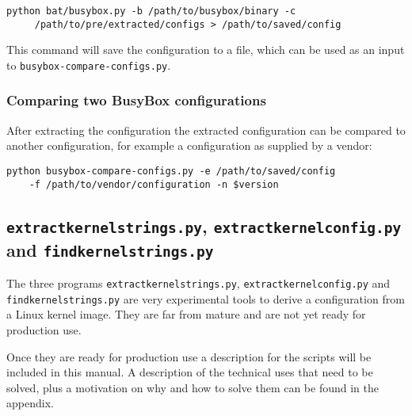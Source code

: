 \documentclass[10pt]{article}
\begin{document}
\begin{verbatim}
python bat/busybox.py -b /path/to/busybox/binary -c
     /path/to/pre/extracted/configs > /path/to/saved/config
\end{verbatim}

This command will save the configuration to a file, which can be used as an
input to \texttt{busybox-compare-configs.py}.

\subsubsection{Comparing two BusyBox configurations}

After extracting the configuration the extracted configuration can be compared
to another configuration, for example a configuration as supplied by a vendor:

\begin{verbatim}
python busybox-compare-configs.py -e /path/to/saved/config
    -f /path/to/vendor/configuration -n $version
\end{verbatim}

\subsection{\texttt{extractkernelstrings.py}, \texttt{extractkernelconfig.py}
\\and \texttt{findkernelstrings.py}}

The three programs \texttt{extractkernelstrings.py},
\texttt{extractkernelconfig.py} and \texttt{findkernelstrings.py} are very
experimental tools to derive a configuration from a Linux kernel image. They
are far from mature and are not yet ready for production use.

Once they are ready for production use a description for the scripts will be
included in this manual. A description of the technical uses that need to be
solved, plus a motivation on why and how to solve them can be found in the
appendix.

\end{document}
